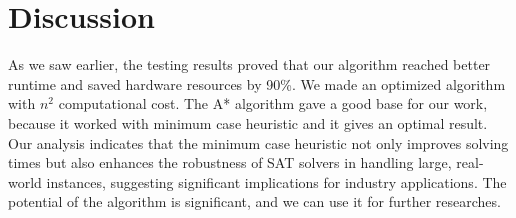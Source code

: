 \documentclass{article}
\begin{document}
\section{Discussion}
As we saw earlier, the testing results proved that our algorithm reached better runtime and saved hardware resources by 90\%. We made an optimized algorithm with $n^2$ computational cost. The A* algorithm gave a good base for our work, because it worked with minimum case heuristic and it gives an optimal result. Our analysis indicates that the minimum case heuristic not only improves solving times but also enhances the robustness of SAT solvers in handling large, real-world instances, suggesting significant implications for industry applications. The potential of the algorithm is significant, and we can use it for further researches.
\end{document}
